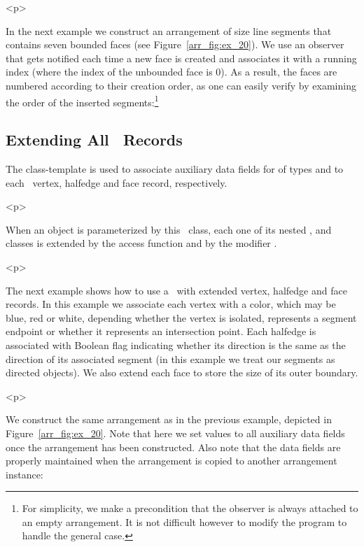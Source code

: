 \begin{ccHtmlOnly}<p>\end{ccHtmlOnly}
In the next example we construct an arrangement of size line segments
that contains seven bounded faces (see Figure~\ref{arr_fig:ex_20}). We
use an observer that gets notified each time a new face is created and
associates it with a running index (where the index of the unbounded face
is 0). As a result, the faces are numbered according to their creation
order, as one can easily verify by examining the order of the inserted
segments:\footnote{For simplicity, we make a precondition that the
observer is always attached to an empty arrangement. It is not difficult
however to modify the program to handle the general case.}


\subsection{Extending All \dcel\ Records}
\label{arr_ssec:ex_dcel_all}
%
The
class-template is used to associate auxiliary data fields for of
types   and  to
each \dcel\ vertex, halfedge and face record, respectively.

\begin{ccHtmlOnly}<p>\end{ccHtmlOnly}
When an  object is parameterized by this
\dcel\ class, each one of its nested ,  and
 classes is extended by the access function 
and by the modifier .

\begin{ccHtmlOnly}<p>\end{ccHtmlOnly}
The next example shows how to use a \dcel\ with extended vertex,
halfedge and face records. In this example we associate each vertex
with a color, which may be blue, red or white, depending whether the
vertex is isolated, represents a segment endpoint or whether it
represents an intersection point. Each halfedge is associated with
Boolean flag indicating whether its direction is the same as the
direction of its associated segment (in this example we treat our
segments as directed objects). We also extend each face to store the
size of its outer boundary.

\begin{ccHtmlOnly}<p>\end{ccHtmlOnly}
We construct the same arrangement as in the previous example,
depicted in Figure~\ref{arr_fig:ex_20}. Note that here we set values
to all auxiliary data fields once the arrangement has been constructed.
Also note that the data fields are properly maintained when the arrangement
is copied to another arrangement instance:
 
